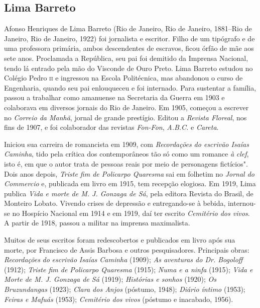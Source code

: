 \subsection{Lima Barreto}

Afonso Henriques de Lima Barreto (Rio de Janeiro, Rio de
Janeiro, 1881--Rio de Janeiro, Rio de Janeiro, 1922) foi jornalista e
escritor. Filho de um tipógrafo e de uma professora primária, ambos
descendentes de escravos, ficou órfão de mãe aos sete anos. Proclamada a
República, seu pai foi demitido da Imprensa Nacional, tendo lá entrado
pela mão do Visconde de Ouro Preto. Lima Barreto estudou no Colégio
Pedro \textsc{ii} e ingressou na Escola Politécnica, mas abandonou o curso de
Engenharia, quando seu pai enlouqueceu e foi internado. Para sustentar a
família, passou a trabalhar como amanuense na Secretaria da Guerra em
1903 e colaborava em diversos jornais do Rio de Janeiro. Em 1905,
começou a escrever no \emph{Correio da Manhã}, jornal de grande
prestígio. Editou a \emph{Revista Floreal}, nos fins de 1907, e foi
colaborador das revistas \emph{Fon-Fon}, \emph{A.B.C.} e \emph{Careta}.

Iniciou sua carreira de romancista em 1909, com \emph{Recordações do
escrivão Isaías Caminha}, tido pela crítica dos contemporâneos tão só
como um romance \emph{à} \emph{clef}, isto é, em que o autor trata de pessoas reais por meio de personagens fictícios". Dois anos depois, \emph{Triste fim
de Policarpo Quaresma} sai em folhetim no \emph{Jornal do Commercio} e,
publicada em livro em 1915, tem recepção elogiosa. Em 1919, Lima publica
\emph{Vida e morte de M. J. Gonzaga de Sá}, pela editora Revista do
Brasil, de Monteiro Lobato. Vivendo crises de depressão e entregando-se
à bebida, internou-se no Hospício Nacional em 1914 e em 1919, daí ter
escrito \emph{Cemitério dos vivos}. A partir de 1918, passou a militar
na imprensa maximalista.

Muitos de seus escritos foram redescobertos e publicados em livro após
sua morte, por Francisco de Assis Barbosa e outros pesquisadores.
Principais obras: \emph{Recordações} \emph{do} \emph{escrivão}
\emph{Isaías Caminha} (1909); \emph{As aventuras do Dr. Bogoloff}
(1912); \emph{Triste fim de Policarpo Quaresma} (1915); \emph{Numa e a
ninfa} (1915); \emph{Vida e Morte de M. J. Gonzaga de Sá} (1919);
\emph{Histórias e sonhos} (1920); \emph{Os Bruzundangas} (1923);
\emph{Clara dos Anjos} (póstumo, 1948); \emph{Diário íntimo} (1953);
\emph{Feiras e Mafuás} (1953); \emph{Cemitério dos vivos} (póstumo e
inacabado, 1956).

